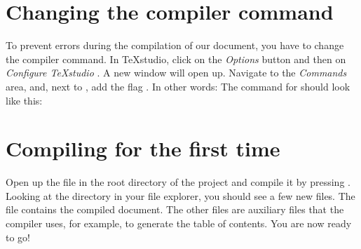\section*{Changing the compiler command}
To prevent errors during the compilation of our document, you have to change the compiler command.
In \TeX{}studio, click on the \emph{Options} button and then on \emph{Configure \TeX{}studio \textellipsis}.
A new window will open up.
Navigate to the \emph{Commands} area, and, next to , add the flag .
In other words: The command for  should look like this:


\section*{Compiling for the first time}
Open up the file  in the root directory of the project and compile it by pressing \faForward. 
Looking at the directory in your file explorer, you should see a few new files.
The  file contains the compiled document.
The other files are auxiliary files that the compiler uses, for example, to generate the table of contents.
You are now ready to go!

\newpage
\nopagecolor
